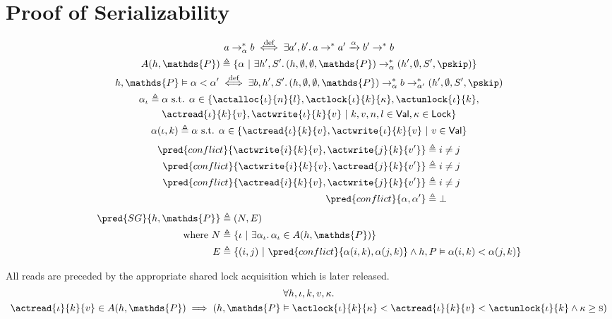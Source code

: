 \section{Proof of Serializability}

\begin{gather*}
a \rightarrow^*_\alpha b \overset{\text{def}}{\iff} \exists a', b' \ldotp a \rightarrow^* a' \xrightarrow{\alpha} b' \rightarrow^* b
\\
A(h, \mathds{P}) \triangleq \{ \alpha\ |\ \exists h', S' \ldotp (h, \emptyset, \emptyset, \mathds{P}) \rightarrow_\alpha^* (h', \emptyset, S', \pskip) \}
\\
h, \mathds{P} \vDash \alpha < \alpha' \overset{\text{def}}{\iff} \exists b, h', S' \ldotp (h, \emptyset, \emptyset, \mathds{P}) \rightarrow_\alpha^* b \rightarrow^*_{\alpha'} (h', \emptyset, S', \pskip)
\\
\alpha_\iota \triangleq \alpha \text{ s.t. } \alpha \in \{ \actalloc{\iota}{n}{l}, \actlock{\iota}{k}{\kappa}, \actunlock{\iota}{k}, \\ \actread{\iota}{k}{v}, \actwrite{\iota}{k}{v}\ |\ k, v, n, l \in \mathsf{Val}, \kappa \in \mathsf{Lock} \}
\\
\alpha(\iota, k) \triangleq \alpha \text{ s.t. } \alpha \in \{ \actread{\iota}{k}{v}, \actwrite{\iota}{k}{v}\ |\ v \in \mathsf{Val} \}
\end{gather*}
\begin{align*}
\pred{conflict}{\actwrite{i}{k}{v}, \actwrite{j}{k}{v'}} &\triangleq i \neq j
\\
\pred{conflict}{\actwrite{i}{k}{v}, \actread{j}{k}{v'}} &\triangleq i \neq j
\\
\pred{conflict}{\actread{i}{k}{v}, \actwrite{j}{k}{v'}} &\triangleq i \neq j
\\
\pred{conflict}{\alpha, \alpha'} &\triangleq \bot 
\end{align*}
\begin{align*}
\pred{SG}{h, \mathds{P}} &\triangleq (N, E) \\
\text{where } N &\triangleq \{ \iota\ |\ \exists \alpha_\iota \ldotp \alpha_\iota \in A(h, \mathds{P}) \} \\
E &\triangleq \{ (i, j)\ |\ \pred{conflict}{\alpha(i, k), \alpha(j, k)} \land h, P \vDash \alpha(i, k) < \alpha(j, k) \}
\end{align*}

\lem All reads are preceded by the appropriate shared lock acquisition which is later released.
\begin{gather*}
\forall h, \iota, k, v, \kappa \ldotp \\
\actread{\iota}{k}{v} \in A(h, \mathds{P}) \implies \left( h, \mathds{P} \vDash \actlock{\iota}{k}{\kappa} < \actread{\iota}{k}{v} < \actunlock{\iota}{k} \land \kappa \geq \textsc{s} \right)
\end{gather*}

